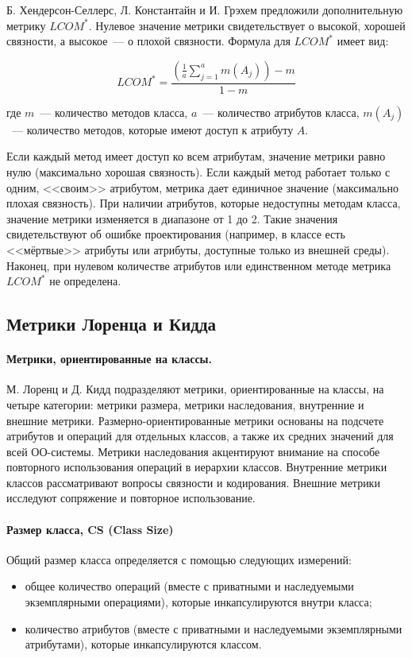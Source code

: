 \documentclass{../../text-style}
\begin{document}
Б. Хендерсон-Селлерс, Л. Константайн и И. Грэхем предложили дополнитель­ную метрику $LCOM^*$. Нулевое значение метрики свидетельствует о высокой, хорошей связности, а высокое~--- о плохой связности. Формула для $LCOM^*$ имеет вид:

$$LCOM^* = \frac{(\frac{1}{a}\sum_{j=1}^{a}m(A_j)) - m}{1 - m}$$

где $m$~--- количество методов класса, $a$~--- количество атрибутов класса, $m(A_j)$~--- количество методов, которые имеют доступ к атрибуту $A$.

Если каждый метод имеет доступ ко всем атрибутам, значение метрики равно нулю (максимально хорошая связность). Если каждый метод работает только с од­ним, <<своим>> атрибутом, метрика дает единичное значение (максимально плохая связность). При наличии атрибутов, которые недоступны методам класса, значение метрики изменяется в диапазоне от 1 до 2. Такие значения свидетельствуют об ошибке проектирования (например, в классе есть <<мёртвые>> атрибуты или атрибуты, доступные только из внешней среды). Наконец, при нулевом количестве атрибутов или единственном методе метрика $LCOM^*$ не определена.

\subsection{Метрики Лоренца и Кидда}

\paragraph{Метрики, ориентированные на классы.} М. Лоренц и Д. Кидд подразделяют метрики, ориентированные на классы, на четыре категории: метрики размера, метрики наследования, внутренние и внешние метрики. Размерно-ориентированные метрики основаны на подсчете атрибутов и опера­ций для отдельных классов, а также их средних значений для всей ОО-системы. Метрики наследования акцентируют внимание на способе повторного использования операций в иерархии классов. Внутренние метрики классов рассматривают вопросы связности и кодирования. Внешние метрики исследуют сопряжение и повторное использование.

\paragraph{Размер класса, CS (Class Size)} Общий размер класса определяется с помощью следующих измерений:

\begin{itemize}
    \item общее количество операций (вместе с приватными и наследуемыми экземплярными операциями), которые инкапсулируются внутри класса;
    \item количество атрибутов (вместе с приватными и наследуемыми экземплярными атрибутами), которые инкапсулируются классом.
\end{itemize}
\end{document}
